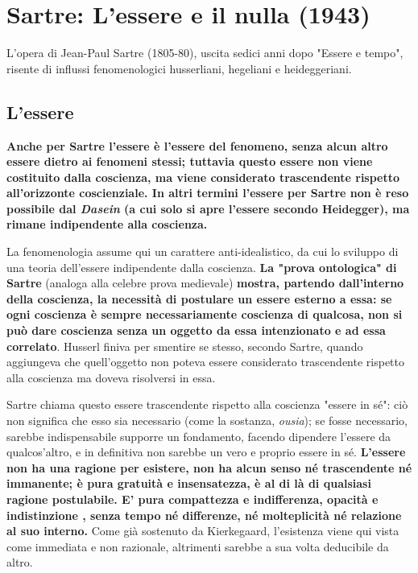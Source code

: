 \section{Sartre: L'essere e il nulla (1943)}


L'opera di  Jean-Paul Sartre (1805-80), uscita sedici anni dopo
"Essere e tempo", risente di influssi fenomenologici husserliani,
hegeliani e heideggeriani.

\subsection{L'essere}

\textbf{Anche per Sartre l'essere è l'essere del fenomeno,
senza alcun altro essere dietro ai fenomeni stessi;
tuttavia questo essere non viene costituito dalla
coscienza, ma viene considerato trascendente rispetto
all'orizzonte coscienziale. In altri termini
l'essere per Sartre non è reso possibile dal
\textit{Dasein} (a cui solo si apre l'essere secondo Heidegger),
ma rimane indipendente alla coscienza.}

La fenomenologia assume qui un carattere
anti-idealistico, da cui lo sviluppo di una teoria
dell'essere indipendente dalla coscienza.
\textbf{La "prova ontologica" di Sartre} (analoga alla
celebre prova medievale)\textbf{ mostra, partendo dall'interno
della coscienza, la necessità di postulare un
essere esterno a essa: se ogni coscienza è sempre
necessariamente coscienza di qualcosa,
non si può dare coscienza senza un oggetto da essa
intenzionato e ad essa correlato}. Husserl finiva
per smentire se stesso, secondo Sartre, quando
aggiungeva che quell'oggetto non poteva essere considerato trascendente rispetto alla coscienza ma doveva
risolversi in essa.

Sartre chiama questo essere trascendente rispetto
alla coscienza "essere in sé": ciò non significa
che esso sia necessario (come la sostanza, \textit{ousia});
se fosse necessario, sarebbe indispensabile supporre
un fondamento, facendo dipendere l'essere da qualcos'altro, e in
definitiva non sarebbe un vero e proprio essere in sé.
\textbf{L'essere non ha una ragione per esistere, non
ha alcun senso né trascendente né immanente;
è pura gratuità e insensatezza, è al di là di
qualsiasi ragione postulabile. E' pura compattezza
e indifferenza, opacità e indistinzione , senza tempo
né differenze, né molteplicità né relazione al suo interno.}
Come già sostenuto da Kierkegaard, l'esistenza viene qui vista come immediata e non razionale, altrimenti sarebbe a sua volta deducibile da altro.

